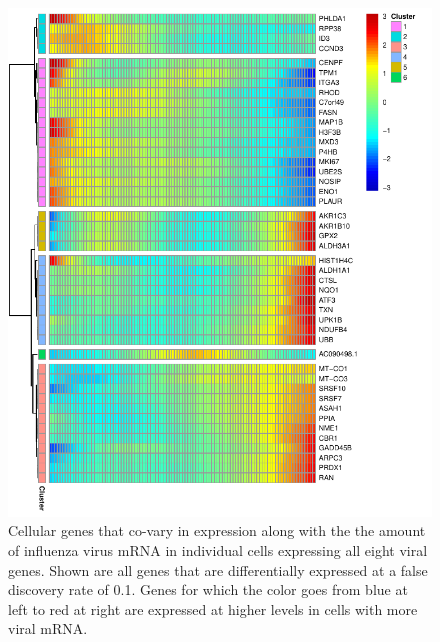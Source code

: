 \documentclass[9pt,lineno]{elife}
\begin{document}
\begin{figure}
\centerline{\includegraphics[width=0.7\linewidth]{figures/p_cellular_heatmap.pdf}}
\caption{\label{fig:cellulargenes}
Cellular genes that co-vary in expression along with the the amount of influenza virus mRNA in individual cells expressing all eight viral genes.
Shown are all genes that are differentially expressed at a false discovery rate of 0.1. 
Genes for which the color goes from blue at left to red at right are expressed at higher levels in cells with more viral mRNA.}
\end{figure}
\end{document}
